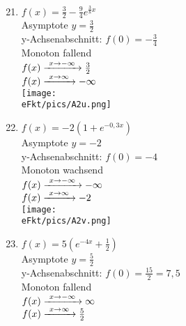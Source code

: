 \begin{Answer}[ref=eFktA2]
\begin{minipage}{\textwidth}
\begin{minipage}[t]{0.49\textwidth}
\begin{enumerate}[label=\alph*)]
			\end{enumerate}
		\end{minipage}
	\end{minipage}\\
	\newpage
	\begin{minipage}{\textwidth}
		\begin{minipage}[t]{0.49\textwidth}
			\begin{enumerate}[label=\alph*)]
				\setcounter{enumi}{20}
				\item \(f(x)=\frac{3}{2}-\frac{9}{4}e^{\frac{3}{8}x}\)\\
				Asymptote \(y=\frac{3}{2}\)\\
				y-Achsenabschnitt: \(f(0)=-\frac{3}{4}\)\\
				Monoton fallend\\
				\(f(x)\xrightarrow{\hphantom{\ }x\to-\infty\hphantom{\ }}\frac{3}{2}\)\\
				\(f(x)\xrightarrow{\hphantom{\ }x\to\infty\hphantom{\ }}-\infty\)\\
				\texttt{[image: \\eFkt/pics/A2u.png]}
				\item \(f(x)=-2\left(1+e^{-0,3x}\right) \)\\
				Asymptote \(y=-2\)\\
				y-Achsenabschnitt: \(f(0)=-4\)\\
				Monoton wachsend\\
				\(f(x)\xrightarrow{\hphantom{\ }x\to-\infty\hphantom{\ }}-\infty\)\\
				\(f(x)\xrightarrow{\hphantom{\ }x\to\infty\hphantom{\ }}-2\)\\
				\texttt{[image: \\eFkt/pics/A2v.png]}
			\end{enumerate}
		\end{minipage}
		\begin{minipage}[t]{0.49\textwidth}
			\begin{enumerate}[label=\alph*)]
				\setcounter{enumi}{22}
				\item \(f(x)=5\left(e^{-4x}+\frac{1}{2}\right) \)\\
				Asymptote \(y=\frac{5}{2}\)\\
				y-Achsenabschnitt: \(f(0)=\frac{15}{2}=7,5\)\\
				Monoton fallend\\
				\(f(x)\xrightarrow{\hphantom{\ }x\to-\infty\hphantom{\ }}\infty\)\\
				\(f(x)\xrightarrow{\hphantom{\ }x\to\infty\hphantom{\ }}\frac{5}{2}\)\\

\end{enumerate}
\end{minipage}
\end{minipage}
\end{Answer}
